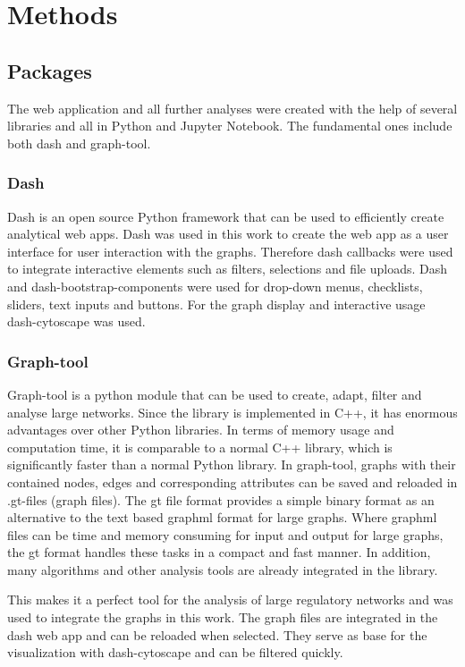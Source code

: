 \documentclass[pdftex,12pt,a4paper]{report}
\begin{document}
\chapter{Methods}
\section{Packages}
The web application and all further analyses were created with the help of several libraries and all in Python and Jupyter Notebook. The fundamental ones include both dash\cite{dash} and graph-tool\cite{graph-tool}.

\subsection{Dash}
\label{dash}
Dash is an open source Python framework that can be used to efficiently create analytical web apps. Dash was used in this work to create the web app as a user interface for user interaction with the graphs. Therefore dash callbacks were used to integrate interactive elements such as filters, selections and file uploads. Dash and dash-bootstrap-components were used for drop-down menus, checklists, sliders, text inputs and buttons. For the graph display and interactive usage dash-cytoscape was used\cite{dash}.


\subsection{Graph-tool}
\label{graphtool}
Graph-tool is a python module that can be used to create, adapt, filter and analyse large networks. Since the library is implemented in C++, it has enormous advantages over other Python libraries. In terms of memory usage and computation time, it is comparable to a normal C++ library, which is significantly faster than a normal Python library. In graph-tool, graphs with their contained nodes, edges and corresponding attributes can be saved and reloaded in .gt-files (graph files). The gt file format provides a simple binary format as an alternative to the text based graphml format for large graphs. Where graphml files can be time and memory consuming for input and output for large graphs, the gt format handles these tasks in a compact and fast manner. In addition, many algorithms and other analysis tools are already integrated in the library\cite{graph-tool}.  

This makes it a perfect tool for the analysis of large regulatory networks and was used to integrate the graphs in this work. The graph files are integrated in the dash web app and can be reloaded when selected. They serve as base for the visualization with dash-cytoscape and can be filtered quickly.
\end{document}
